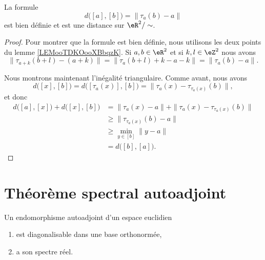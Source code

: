 \begin{proposition}	\label{PROPooUVTXooYxwdtb}
	La formule
	\begin{equation}
		d\big( [a],[b] \big)=\| \tau_a(b)-a \|
	\end{equation}
	est bien définie et est une distance sur \( \eR^2/\sim\).
\end{proposition}

\begin{proof}
	Pour montrer que la formule est bien définie, nous utilisons les deux points du lemme \ref{LEMooTDKOooXBbqzK}. Si \( a,b\in \eR^2\) et si \( k,l\in \eZ^2\) nous avons
	\begin{equation}
		\| \tau_{a+k}(b+l)-(a+k) \|=\| \tau_{a}(b+l)+k-a-k \|=\| \tau_a(b)-a \|.
	\end{equation}

	Nous montrons maintenant l'inégalité triangulaire. Comme avant, nous avons
	\begin{equation}
		d\big( [x],[b] \big)=d\big( [\tau_a(x)],[b] \big)=\| \tau_a(x)-\tau_{\tau_a(x)}(b) \|,
	\end{equation}
	et donc
	\begin{subequations}
		\begin{align}
			d\big( [a],[x] \big)+d\big( [x],[b] \big) & = \| \tau_a(x)-a \|+\| \tau_a(x)-\tau_{\tau_a(x)}(b) \| \\
			                                          & \geq\| \tau_{\tau_a(x)}(b)-a \|                         \\
			                                          & \geq \min_{y\in[b]}\| y-a \|                            \\
			                                          & =d\big( [b],[a] \big).
		\end{align}
	\end{subequations}
\end{proof}

\section{Théorème spectral autoadjoint}

\begin{theorem} \label{ThoRSBahHH}
	Un endomorphisme autoadjoint d'un espace euclidien
	\begin{enumerate}
		\item
		      est diagonalisable dans une base orthonormée,
		\item
		      a son spectre réel.
	\end{enumerate}
\end{theorem}

